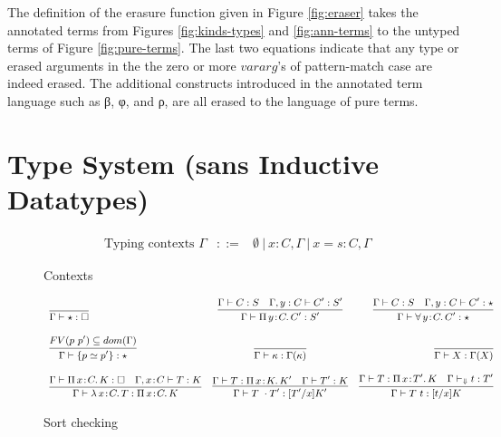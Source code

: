 \documentclass{article}
\newcommand{\ann}[2]{#1\! : \! #2}
\newcommand{\abs}[4]{{#1}\, #2\! : \! #3.\, #4}
\newcommand{\decchk}{\vdash_{\Downarrow}}
\begin{document}
The definition of the erasure function given in Figure \ref{fig:eraser} takes
the annotated terms from Figures \ref{fig:kinds-types} and \ref{fig:ann-terms} to
the untyped terms of Figure \ref{fig:pure-terms}. The last two equations
indicate that any type or erased arguments in the the zero or more $vararg$'s of
pattern-match case are indeed erased. The additional constructs introduced in
the annotated term language such as β, φ, and ρ, are all erased to the language
of pure terms.

\section{Type System (sans Inductive Datatypes)}
\label{sec:type-system}

\begin{figure}[h]
  \caption{Contexts}
  \[
    \begin{array}{llll}
      \text{ Typing contexts } \Gamma
      & ::= & \emptyset\ |\ \ann{x}{C},\Gamma\ |\ \ann{x=s}{C},\Gamma
    \end{array}
  \]
\end{figure}
\begin{figure}[h!]
  \[ \small
    \begin{array}{lcr}
      \infer{\Gamma\vdash \star : \Box}{\ }
      & \infer
        { \Gamma\vdash\abs{\Pi}{y}{C}{C'} : S'}
        { \Gamma \vdash C : S
        \quad
        \Gamma,y:C\vdash C' : S'
        }
      & \infer
        {\Gamma\vdash\abs{\forall}{y}{C}{C'} : \star}
        {\Gamma \vdash C : S
        \quad \Gamma,y:C\vdash C' : \star
        }
      \\
      \\ \infer
      { \Gamma \vdash \{p \simeq p' \} : \star}
      { FV(p\ p') \subseteq dom(\Gamma) }
      & \infer
        { \Gamma \vdash \kappa : \Gamma(\kappa)}
        { }
      & \infer
        { \Gamma \vdash X : \Gamma(X)}
        { }
      \\
      \\ \infer
      { \Gamma \vdash \abs{\lambda}{x}{C}{T} : \abs{\Pi}{x}{C}{K}}
      { \Gamma \vdash \abs{\Pi}{x}{C}{K} : \square
      \quad \Gamma, \ann{x}{C} \vdash T : K
      }
      & \infer
        { \Gamma \vdash T\ \cdot T' : [T'/x] K'}
        { \Gamma \vdash T : \abs{\Pi}{x}{K}{K'}
        \quad \Gamma \vdash T' : K}
      & \infer
       { \Gamma \vdash T\ t : [t/x] K}
        { \Gamma \vdash T : \abs{\Pi}{x}{T'}{K}
        \quad \Gamma \decchk t : T' }
    \end{array}
  \]
  \caption{Sort checking }
  \label{fig:sort-checking}
\end{figure}
\end{document}
